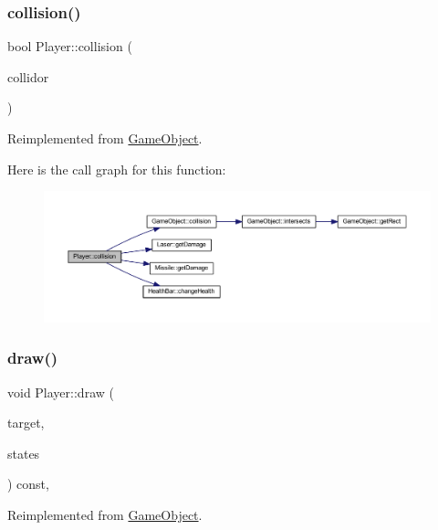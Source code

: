 \subsubsection{\texorpdfstring{collision()}{collision()}}
{\footnotesize\ttfamily bool Player\+::collision (\begin{DoxyParamCaption}\item[{const std\+::shared\+\_\+ptr$<$ \hyperlink{class_game_object}{Game\+Object} $>$ \&}]{collidor }\end{DoxyParamCaption})\hspace{0.3cm}{\ttfamily [virtual]}}



Reimplemented from \hyperlink{class_game_object_a56a330813f51b91b2ad8aacb42b6d8ea}{Game\+Object}.

Here is the call graph for this function\+:
\nopagebreak
\begin{figure}[H]
\begin{center}
\leavevmode
\includegraphics[width=350pt]{class_player_a669d12e0034e51489a37268b2ca7aab0_cgraph}
\end{center}
\end{figure}
\mbox{\label{class_player_a0ca934f76860c378cd991a8a32f27edd}} 
\subsubsection{\texorpdfstring{draw()}{draw()}}
{\footnotesize\ttfamily void Player\+::draw (\begin{DoxyParamCaption}\item[{sf\+::\+Render\+Target \&}]{target,  }\item[{sf\+::\+Render\+States}]{states }\end{DoxyParamCaption}) const\hspace{0.3cm}{\ttfamily [override]}, {\ttfamily [virtual]}}



Reimplemented from \hyperlink{class_game_object_aa6d7650a920e2dd79b0125560faf3807}{Game\+Object}.

